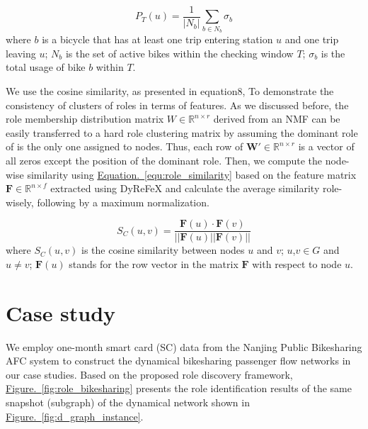 \documentclass[a4paper,fleqn]{cas-sc}
\begin{document}
\begin{equation}
P_T(u) = \frac{1}{|N_{b}|}\sum\limits_{b\in N_{b}}\sigma_{b}
\label{equ:pass_thro_turnover}
\end{equation}
\indent where $b$ is a bicycle that has at least one trip entering station $u$ and one trip leaving $u$; $N_{b}$ is the set of active bikes within the checking window $T$; $\sigma_{b}$ is the total usage of bike $b$ within $T$.\newline

We use the cosine similarity, as presented in equation8, To demonstrate the consistency of clusters of roles in terms of features. As we discussed before, the role membership distribution matrix $W\in \mathbb{R}^{n\times r}$ derived from an NMF can be easily transferred to a hard role clustering matrix by assuming the dominant role of is the only one assigned to nodes. Thus, each row of $\mathbf{W'}\in \mathbb{R}^{n\times r}$ is a vector of all zeros except the position of the dominant role. Then, we compute the node-wise similarity using \hyperref[equ:role_similarity]{Equation.~\ref{equ:role_similarity}} based on the feature matrix $\mathbf{F}\in \mathbb{R}^{n\times f}$ extracted using DyReFeX and calculate the average similarity role-wisely, following by a maximum normalization.

\begin{equation}
S_C(u,v) = \frac{\mathbf{F}(u)\cdot \mathbf{F}(v)}{||\mathbf{F}(u)||\mathbf{F}(v)||}
\label{equ:role_similarity}
\end{equation}
\indent where $S_C(u,v)$ is the cosine similarity between nodes $u$ and $v$; $u$,$v\in G$ and $u\neq v$; $\mathbf{F}(u)$ stands for the row vector in the matrix $\mathbf{F}$ with respect to node $u$.

\section{Case study}\label{case_study}
We employ one-month smart card (SC) data from the Nanjing Public Bikesharing AFC system to construct the dynamical bikesharing passenger flow networks in our case studies. Based on the proposed role discovery framework, \hyperref[fig:role_bikesharing]{Figure.~\ref{fig:role_bikesharing}} presents the role identification results of the same snapshot (subgraph) of the dynamical network shown in \hyperref[fig:d_graph_instance]{Figure.~\ref{fig:d_graph_instance}}. 
\end{document}
